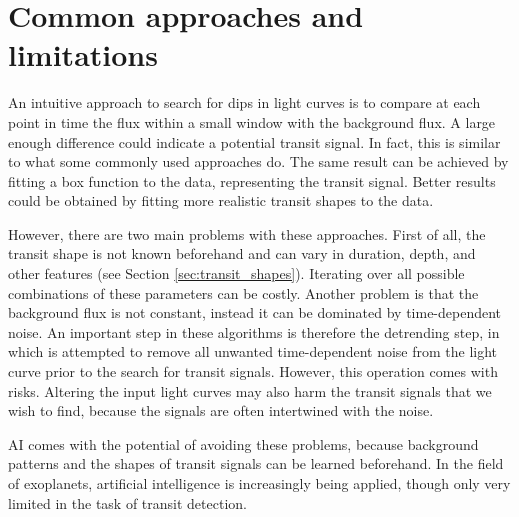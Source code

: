 
\section{Common approaches and limitations}

An intuitive approach to search for dips in light curves is to compare at each point in time the flux within a small window with the background flux. A large enough difference could indicate a potential transit signal. In fact, this is similar to what some commonly used approaches do. The same result can be achieved by fitting a box function to the data, representing the transit signal. Better results could be obtained by fitting more realistic transit shapes to the data. 

However, there are two main problems with these approaches. First of all, the transit shape is not known beforehand and can vary in duration, depth, and other features (see Section \ref{sec:transit_shapes}). Iterating over all possible combinations of these parameters can be costly. Another problem is that the background flux is not constant, instead it can be dominated by time-dependent noise. An important step in these algorithms is therefore the detrending step, in which is attempted to remove all unwanted time-dependent noise from the light curve prior to the search for transit signals. However, this operation comes with risks. Altering the input light curves may also harm the transit signals that we wish to find, because the signals are often intertwined with the noise. 

AI comes with the potential of avoiding these problems, because background patterns and the shapes of transit signals can be learned beforehand. In the field of exoplanets, artificial intelligence is increasingly being applied, though only very limited in the task of transit detection.
